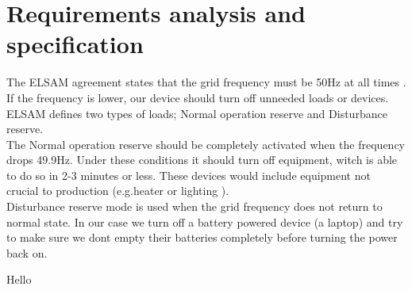 \chapter[Requirements]{Requirements analysis and specification}
\label{chap:requirements}
The ELSAM agreement states that the grid frequency must be 50Hz at all times . If the frequency is lower, our device should turn off unneeded loads or devices. ELSAM defines two types of loads; Normal operation reserve and Disturbance reserve.\\
The Normal operation reserve should be completely activated when the frequency drops 49.9Hz. Under these conditions it should turn off equipment, witch is able to do so in 2-3 minutes or less. These devices would include equipment not crucial to production (e.g.heater or lighting ).\\ 
Disturbance reserve mode is used when the grid frequency does not return to normal state. In our case we turn off a battery powered device (a laptop) and try to make sure we dont empty their batteries completely before turning the power back on.

Hello

